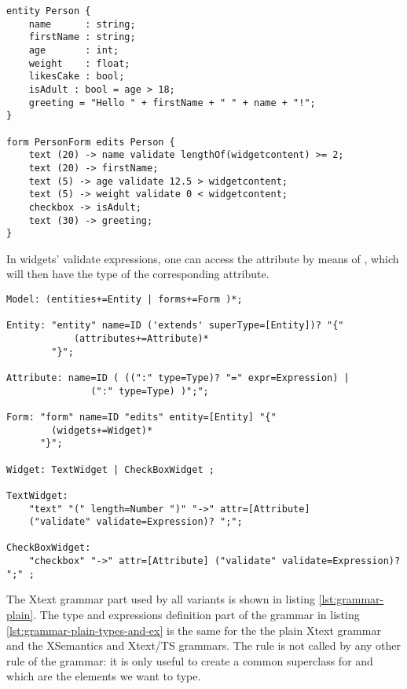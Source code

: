 \begin{lstlisting}[language=guidsl,float,label=lst:example-plain,caption=Forms
and Entities DSL.] 
entity Person {
	name      : string;
	firstName : string;
	age       : int; 
	weight    : float;
	likesCake : bool; 
	isAdult : bool = age > 18;
	greeting = "Hello " + firstName + " " + name + "!";
}

form PersonForm edits Person {
	text (20) -> name validate lengthOf(widgetcontent) >= 2;
	text (20) -> firstName;
	text (5) -> age validate 12.5 > widgetcontent;
	text (5) -> weight validate 0 < widgetcontent;
	checkbox -> isAdult;
	text (30) -> greeting;
}
\end{lstlisting}

In widgets' validate expressions, one can access the attribute by means of
, which will then have the type of the corresponding
attribute.

%

\begin{lstlisting}[language=xtext,float,label=lst:grammar-plain,caption=Grammar
with plain Xtext.] 
Model: (entities+=Entity | forms+=Form )*;

Entity: "entity" name=ID ('extends' superType=[Entity])? "{"
			(attributes+=Attribute)*
		"}";

Attribute: name=ID ( ((":" type=Type)? "=" expr=Expression) | 
               (":" type=Type) )";";

Form: "form" name=ID "edits" entity=[Entity] "{"	
		(widgets+=Widget)*
	  "}";

Widget: TextWidget | CheckBoxWidget ;

TextWidget:
	"text" "(" length=Number ")" "->" attr=[Attribute] 
	("validate" validate=Expression)? ";";

CheckBoxWidget:
	"checkbox" "->" attr=[Attribute] ("validate" validate=Expression)? ";" ;
\end{lstlisting}

The Xtext grammar part used by all variants is shown in listing
\ref{lst:grammar-plain}. The type and expressions definition part of the grammar
in listing \ref{lst:grammar-plain-types-and-ex} is the same for the the plain
Xtext grammar and the XSemantics and Xtext/TS grammars. 
The rule  is not called by any other rule of the grammar: it is
only useful to create a common superclass for  and
 which are the elements we want to type.

